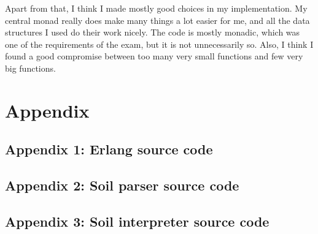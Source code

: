 \documentclass[a4paper]{article}
\begin{document}
Apart from that, I think I made mostly good choices in my implementation. My central monad really does make many things a lot easier for me, and all the data structures I used do their work nicely. The code is mostly monadic, which was one of the requirements of the exam, but it is not unnecessarily so. Also, I think I found a good compromise between too many very small functions and few very big functions.

\newpage
\section*{Appendix}
\subsection*{Appendix 1: Erlang source code}




\subsection*{Appendix 2: Soil parser source code}





\subsection*{Appendix 3: Soil interpreter source code}



\end{document}
